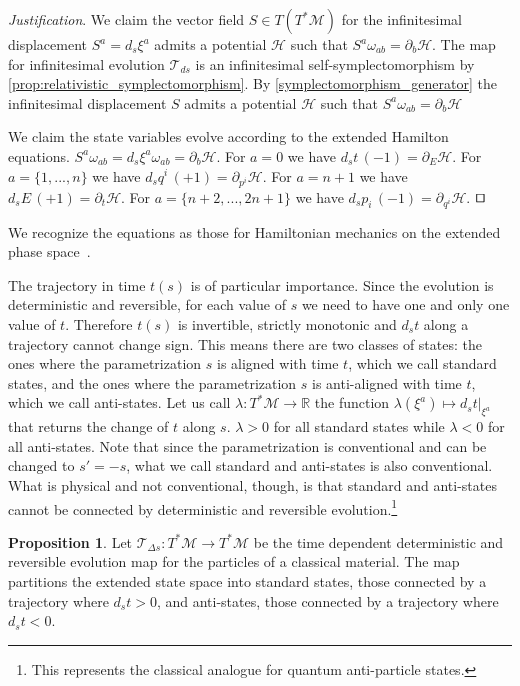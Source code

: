 \documentclass[smallextended]{svjour3}
\numberwithin{equation}{section}
\newenvironment{justification}{\emph{Justification}.}{\hfill\(\qed\)}
\theoremstyle{definition}
\newtheorem{prop}[equation]{Proposition}
\newenvironment{justification}{\emph{Justification}.}{\qed}
\begin{document}
\begin{justification}
We claim the vector field $S \in T(T^*\mathcal{M})$ for the infinitesimal displacement $S^a = d_s\xi^a$ admits a potential $\mathcal{H}$ such that $S^{a} \omega_{ab} = \partial_{b}\mathcal{H}$. The map for infinitesimal evolution $\mathcal{T}_{ds}$ is an infinitesimal self-symplectomorphism by \ref{prop:relativistic_symplectomorphism}. By \ref{symplectomorphism_generator} the infinitesimal displacement $S$ admits a potential $\mathcal{H}$ such that $S^{a} \omega_{ab} = \partial_{b}\mathcal{H}$

We claim the state variables evolve according to the extended Hamilton equations. $S^{a} \omega_{ab} = d_s\xi^a \omega_{ab} = \partial_{b}\mathcal{H}$. For $a = 0$ we have $d_s t \, (-1) = \partial_{E} \mathcal{H}$. For  $a=\{1,...,n\}$ we have $d_s q^i \, (+1) = \partial_{p^i} \mathcal{H}$. For $a=n+1$ we have $d_s E \, (+1) = \partial_{t} \mathcal{H}$. For $a=\{n+2,...,2n + 1\}$ we have $d_s p_i \, (-1) = \partial_{q^i} \mathcal{H}$.
\end{justification}

We recognize the equations as those for Hamiltonian mechanics on the extended phase space~\cite{Synge,Lanczos,Struckmeier}.

The trajectory in time $t(s)$ is of particular importance. Since the evolution is deterministic and reversible, for each value of $s$ we need to have one and only one value of $t$. Therefore $t(s)$ is invertible, strictly monotonic and $d_{s}t$ along a trajectory cannot change sign. This means there are two classes of states: the ones where the parametrization $s$ is aligned with time $t$, which we call standard states, and the ones where the parametrization $s$ is anti-aligned with time $t$, which we call anti-states. Let us call $\lambda : T^*\mathcal{M} \rightarrow \mathbb{R}$ the function $\lambda (\xi^a) \mapsto d_s t |_{\xi^a}$ that returns the change of $t$ along $s$. $\lambda > 0$ for all standard states while $\lambda < 0$ for all anti-states.  Note that since the parametrization is conventional and can be changed to $s'=-s$, what we call standard and anti-states is also conventional. What is physical and not conventional, though, is that standard and anti-states cannot be connected by deterministic and reversible evolution.\footnote{This represents the classical analogue for quantum anti-particle states.}

\begin{prop}\label{prop:antistates}
	Let $\mathcal{T}_{\Delta s}: T^*\mathcal{M} \rightarrow T^*\mathcal{M}$ be the time dependent deterministic and reversible evolution map for the particles of a classical material. The map partitions the extended state space into standard states, those connected by a trajectory where $d_{s}t>0$, and anti-states, those connected by a trajectory where $d_{s}t<0$.
\end{prop}
\end{document}
